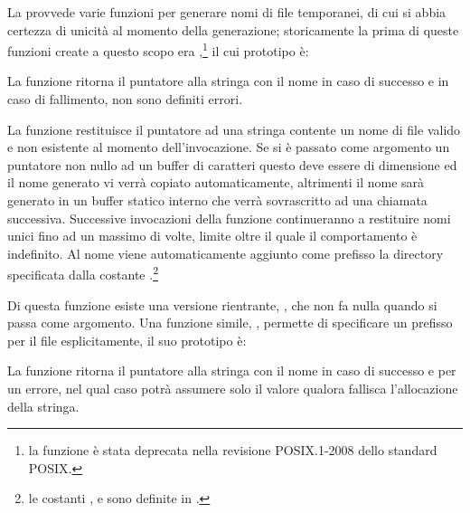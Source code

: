 
La  provvede varie funzioni per generare nomi di file temporanei,
di cui si abbia certezza di unicità al momento della generazione; storicamente
la prima di queste funzioni create a questo scopo era
,\footnote{la funzione è stata deprecata nella revisione
  POSIX.1-2008 dello standard POSIX.} il cui prototipo è:

\begin{funcproto}{
}
{La funzione ritorna il puntatore alla stringa con il nome in caso di successo
  e  in caso di fallimento, non sono definiti errori.}
\end{funcproto}

La funzione restituisce il puntatore ad una stringa contente un nome di file
valido e non esistente al momento dell'invocazione. Se si è passato come
argomento  un puntatore non nullo ad un buffer di caratteri
questo deve essere di dimensione  ed il nome generato vi
verrà copiato automaticamente, altrimenti il nome sarà generato in un buffer
statico interno che verrà sovrascritto ad una chiamata successiva.  Successive
invocazioni della funzione continueranno a restituire nomi unici fino ad un
massimo di  volte, limite oltre il quale il comportamento è
indefinito. Al nome viene automaticamente aggiunto come prefisso la directory
specificata dalla costante .\footnote{le costanti
  ,  e  sono definite in
  .}

Di questa funzione esiste una versione rientrante, , che non
fa nulla quando si passa  come argomento.  Una funzione simile,
, permette di specificare un prefisso per il file
esplicitamente, il suo prototipo è:

\begin{funcproto}{
}
{La funzione ritorna il puntatore alla stringa con il nome in caso di successo
  e  per un errore, nel qual caso  potrà assumere solo il
  valore  qualora fallisca l'allocazione della stringa.}
\end{funcproto}

